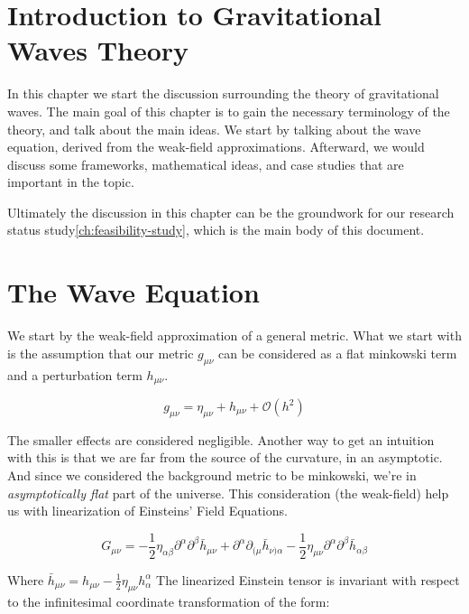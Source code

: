 \section{Introduction to Gravitational Waves Theory}\label{sec:introduction-to-gravitational-waves-theory}

In this chapter we start the discussion surrounding the theory of gravitational waves.
The main goal of this chapter is to gain the necessary terminology of the theory, and talk about the main ideas.
We start by talking about the wave equation, derived from the weak-field approximations.
Afterward, we would discuss some frameworks, mathematical ideas, and case studies that are important in the topic.

Ultimately the discussion in this chapter can be the groundwork for our research status study\ref{ch:feasibility-study}, which is the main body of this document.


\section{The Wave Equation}\label{sec:derivation-of-the-wave-equation}
We start by the weak-field approximation of a general metric.
What we start with is the assumption that our metric $g_{\mu\nu}$ can be considered as a flat minkowski term and a perturbation term $h_{\mu\nu}$.

\begin{equation}
    g_{\mu\nu} = \eta_{\mu\nu} + h_{\mu\nu} + \mathcal{O}(h^2)\label{eq:weak-field-metric}
\end{equation}

The smaller effects are considered negligible.
Another way to get an intuition with this is that we are far from the source of the curvature, in an asymptotic.
And since we considered the background metric to be minkowski, we're in \textit{asymptotically flat} part of the universe.
This consideration (the weak-field) help us with linearization of Einsteins' Field Equations.

\begin{equation}
    G_{\mu\nu} = -\frac{1}{2} \eta_{\alpha\beta}\partial^{\alpha}\partial^{\beta}\bar{h}_{\mu\nu} + \partial^{\alpha}\partial_{(\mu}\bar{h}_{\nu)\alpha} - \frac{1}{2}\eta_{\mu\nu}\partial^{\alpha}\partial^{\beta}\bar{h}_{\alpha\beta}\label{eq:linearized-einstein-field-tensor}
\end{equation}

Where $\bar h_{\mu\nu} = h_{\mu\nu} - \frac12 \eta_{\mu\nu}h^\alpha_\alpha$ The linearized Einstein tensor is invariant with respect to the infinitesimal coordinate transformation of the form:

